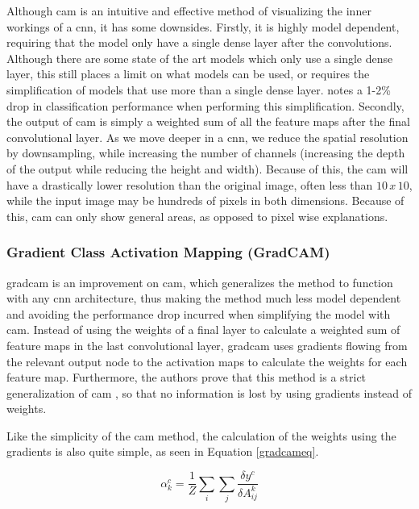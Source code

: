 \documentclass[UKenglish]{uiomasterthesis} %
\theoremstyle{definition}
\begin{document}
Although \ac{cam} is an intuitive and effective method of visualizing the inner workings of a \ac{cnn}, it has some downsides. Firstly, it is highly model dependent, requiring that the model only have a single dense layer after the convolutions. Although there are some state of the art models which only use a single dense layer, this still places a limit on what models can be used, or requires the simplification of models that use more than a single dense layer. \cite[4]{cam} notes a 1-2\% drop in classification performance when performing this simplification. Secondly, the output of \ac{cam} is simply a weighted sum of all the feature maps after the final convolutional layer. As we move deeper in a \ac{cnn}, we reduce the spatial resolution by downsampling, while increasing the number of channels (increasing the depth of the output while reducing the height and width). Because of this, the \ac{cam} will have a drastically lower resolution than the original image, often less than $10 \, x \, 10$, while the input image may be hundreds of pixels in both dimensions. Because of this, \ac{cam} can only show general areas, as opposed to pixel wise explanations.
\\

\subsubsection{Gradient Class Activation Mapping (GradCAM)} \label{section:gradcam}

\ac{gradcam} \cite{gradcam} is an improvement on \ac{cam}, which generalizes the method to function with any \ac{cnn} architecture, thus making the method much less model dependent and avoiding the performance drop incurred when simplifying the model with \ac{cam}. Instead of using the weights of a final layer to calculate a weighted sum of feature maps in the last convolutional layer, \ac{gradcam} uses gradients flowing from the relevant output node to the activation maps to calculate the weights for each feature map. Furthermore, the authors prove that this method is a strict generalization of \ac{cam} \cite[5]{gradcam}, so that no information is lost by using gradients instead of weights.

Like the simplicity of the \ac{cam} method, the calculation of the weights using the gradients is also quite simple, as seen in Equation \ref{gradcameq}.

\begin{equation}
\alpha^c_k = \frac{1}{Z} \sum_i \sum_j \frac{\delta y^c}{\delta A^k_{ij}}
\label{gradcameq}
\end{equation}
\end{document}
